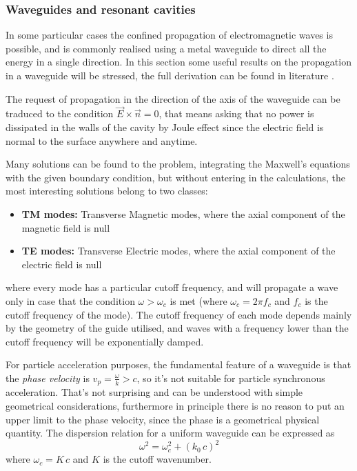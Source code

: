 \subsubsection[Waveguides and resonant cavities]{Waveguides and resonant cavities}

In some particular cases the confined propagation of electromagnetic waves is possible, and is commonly realised using a metal waveguide to direct all the energy in a single direction. In this section some useful results on the propagation in a waveguide will be stressed, the full derivation can be found in literature \cite{Botta:EM, Jackson:ClassEM,Weiss:261732}. 

The request of propagation in the direction of the axis of the waveguide can be traduced to the condition $\vec{E} \times \vec{n} = 0$, that means asking that no power is dissipated in the walls of the cavity by Joule effect since the electric field is normal to the surface anywhere and anytime.

Many solutions can be found to the problem, integrating the Maxwell's equations with the given boundary condition, but without entering in the calculations, the most interesting solutions belong to two classes:
\begin{itemize}
\item \textbf{TM modes:} Transverse Magnetic modes, where the axial component of the magnetic field is null
\item \textbf{TE modes:} Transverse Electric modes, where the axial component of the electric field is null
\end{itemize}
where every mode has a particular cutoff frequency, and will propagate a wave only in case that the condition $\omega > \omega_c$ is met (where $\omega_c = 2\pi f_c$ and $f_c$ is the cutoff frequency of the mode). The cutoff frequency of each mode depends mainly by the geometry of the guide utilised, and waves with a frequency lower than the cutoff frequency will be exponentially damped.

For particle acceleration purposes, the fundamental feature of a waveguide is that the \textit{phase velocity} is $v_p = \frac{\omega}{k} > c$, so it's not suitable for particle synchronous acceleration. That's not surprising and can be understood with simple geometrical considerations\cite{Weiss:261732}, furthermore in principle there is no reason to put an upper limit to the phase velocity, since the phase is a geometrical physical quantity. The dispersion relation for a uniform waveguide can be expressed as 
\begin{equation}
\omega^2 = \omega^2_c + (k_0 \, c)^2
\end{equation}
where $\omega_c = K \, c$ and $K$ is the cutoff wavenumber.

